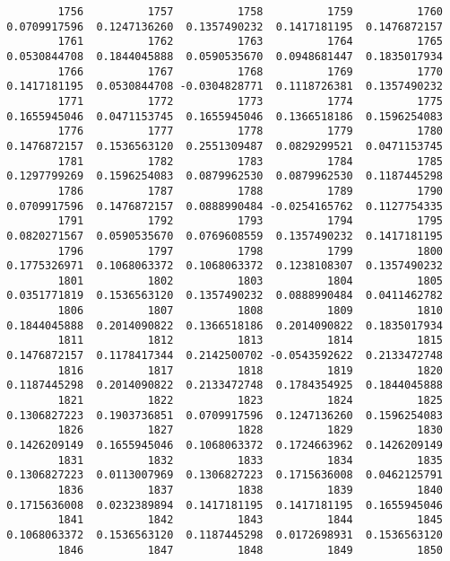 \documentclass[
  letterpaper,
  DIV=11,
  numbers=noendperiod]{scrreprt}
\begin{document}
\begin{verbatim}
         1756          1757          1758          1759          1760 
 0.0709917596  0.1247136260  0.1357490232  0.1417181195  0.1476872157 
         1761          1762          1763          1764          1765 
 0.0530844708  0.1844045888  0.0590535670  0.0948681447  0.1835017934 
         1766          1767          1768          1769          1770 
 0.1417181195  0.0530844708 -0.0304828771  0.1118726381  0.1357490232 
         1771          1772          1773          1774          1775 
 0.1655945046  0.0471153745  0.1655945046  0.1366518186  0.1596254083 
         1776          1777          1778          1779          1780 
 0.1476872157  0.1536563120  0.2551309487  0.0829299521  0.0471153745 
         1781          1782          1783          1784          1785 
 0.1297799269  0.1596254083  0.0879962530  0.0879962530  0.1187445298 
         1786          1787          1788          1789          1790 
 0.0709917596  0.1476872157  0.0888990484 -0.0254165762  0.1127754335 
         1791          1792          1793          1794          1795 
 0.0820271567  0.0590535670  0.0769608559  0.1357490232  0.1417181195 
         1796          1797          1798          1799          1800 
 0.1775326971  0.1068063372  0.1068063372  0.1238108307  0.1357490232 
         1801          1802          1803          1804          1805 
 0.0351771819  0.1536563120  0.1357490232  0.0888990484  0.0411462782 
         1806          1807          1808          1809          1810 
 0.1844045888  0.2014090822  0.1366518186  0.2014090822  0.1835017934 
         1811          1812          1813          1814          1815 
 0.1476872157  0.1178417344  0.2142500702 -0.0543592622  0.2133472748 
         1816          1817          1818          1819          1820 
 0.1187445298  0.2014090822  0.2133472748  0.1784354925  0.1844045888 
         1821          1822          1823          1824          1825 
 0.1306827223  0.1903736851  0.0709917596  0.1247136260  0.1596254083 
         1826          1827          1828          1829          1830 
 0.1426209149  0.1655945046  0.1068063372  0.1724663962  0.1426209149 
         1831          1832          1833          1834          1835 
 0.1306827223  0.0113007969  0.1306827223  0.1715636008  0.0462125791 
         1836          1837          1838          1839          1840 
 0.1715636008  0.0232389894  0.1417181195  0.1417181195  0.1655945046 
         1841          1842          1843          1844          1845 
 0.1068063372  0.1536563120  0.1187445298  0.0172698931  0.1536563120 
         1846          1847          1848          1849          1850 

\end{verbatim}
\end{document}
